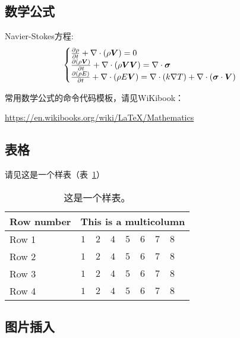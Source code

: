 \subsection{数学公式}

Navier-Stokes方程:
\begin{equation} \label{eq:ns}
    \begin{cases}
        \frac{\partial \rho}{\partial t} + \nabla\cdot(\rho\boldsymbol{V}) = 0 \\
        \frac{\partial (\rho\boldsymbol{V})}{\partial t} + \nabla\cdot(\rho\boldsymbol{V}\boldsymbol{V}) = \nabla\cdot\boldsymbol{\mathsf{\sigma}}\\
        \frac{\partial (\rho E)}{\partial t} + \nabla\cdot(\rho E\boldsymbol{V}) = \nabla\cdot(k\nabla T) + \nabla\cdot(\boldsymbol{\mathsf{\sigma}}\cdot\boldsymbol{V})
    \end{cases}
\end{equation}

常用数学公式的命令代码模板，请见WiKibook：

\url{https://en.wikibooks.org/wiki/LaTeX/Mathematics}

\subsection{表格}

请见这是一个样表（表~\ref{tab:sample}）
\begin{table}[!htbp]
    \centering
    \footnotesize%
    \setlength{\tabcolsep}{4pt}%
    \renewcommand{\arraystretch}{1.2}%
    \begin{tabular}{lcccccccc}
        \hline\hline
        Row number & \multicolumn{8}{c}{This is a multicolumn} \\
        \hline
        Row 1 & $1$ & $2$ & $4$ & $5$ & $6$ & $7$ & $8$\\
        \hline
        Row 2 & $1$ & $2$ & $4$ & $5$ & $6$ & $7$ & $8$\\
        \hline
        Row 3 & $1$ & $2$ & $4$ & $5$ & $6$ & $7$ & $8$\\
        \hline
        Row 4 & $1$ & $2$ & $4$ & $5$ & $6$ & $7$ & $8$\\
        \hline\hline
    \end{tabular}
    \caption{这是一个样表。}
    \label{tab:sample}
\end{table}

\subsection{图片插入}

